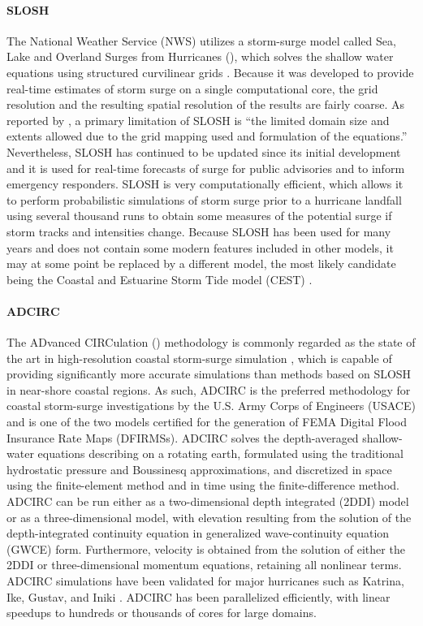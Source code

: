 \paragraph{SLOSH} The National Weather Service (NWS) utilizes a storm-surge model called Sea, Lake and Overland Surges from Hurricanes (), which solves the shallow water equations using structured curvilinear grids \citep{jelesnianski1992NWS48}. Because it was developed to provide real-time estimates of storm surge on a single computational core, the grid resolution and the resulting spatial resolution of the results are fairly coarse. As reported by \citet{mandli2014adaptive}, a primary limitation of SLOSH is ``the limited domain size and extents allowed due to the grid mapping used and formulation of the equations.'' Nevertheless, SLOSH has continued to be updated since its initial development and it is used for real-time forecasts of surge for public advisories and to inform emergency responders. SLOSH is very computationally efficient, which allows it to perform probabilistic simulations of storm surge prior to a hurricane landfall using several thousand runs to obtain some measures of the potential surge if storm tracks and intensities change. Because SLOSH has been used for many years and does not contain some modern features included in other models, it may at some point be replaced by a different model, the most likely candidate being the Coastal and Estuarine Storm Tide model (CEST) \citep{zhang2017transition}. 

\paragraph{ADCIRC} The ADvanced CIRCulation () methodology is commonly regarded as the state of the art in high-resolution coastal storm-surge simulation \citep{luettich1992adcirc}, which is capable of providing significantly more accurate simulations than methods based on SLOSH \citep{resio2008modeling} in near-shore coastal regions. As such, ADCIRC is the preferred methodology for coastal storm-surge investigations by the U.S. Army Corps of Engineers (USACE) and is one of the two models certified for the generation of FEMA Digital Flood Insurance Rate Maps (DFIRMSs). ADCIRC solves the depth-averaged shallow-water equations describing on a rotating earth, formulated using the traditional hydrostatic pressure and Boussinesq approximations, and discretized in space using the finite-element method and in time using the finite-difference method. ADCIRC can be run either as a two-dimensional depth integrated (2DDI) model or as a three-dimensional model, with elevation resulting from the solution of the depth-integrated continuity equation in generalized wave-continuity equation (GWCE) form. Furthermore, velocity is obtained from the solution of either the 2DDI or three-dimensional momentum equations, retaining all nonlinear terms. ADCIRC simulations have been validated for major hurricanes such as Katrina, Ike, Gustav, and Iniki \citep{kennedy2011origin, kennedy2012tropical}. ADCIRC has been parallelized efficiently, with linear speedups to hundreds or thousands of cores for large domains. 

